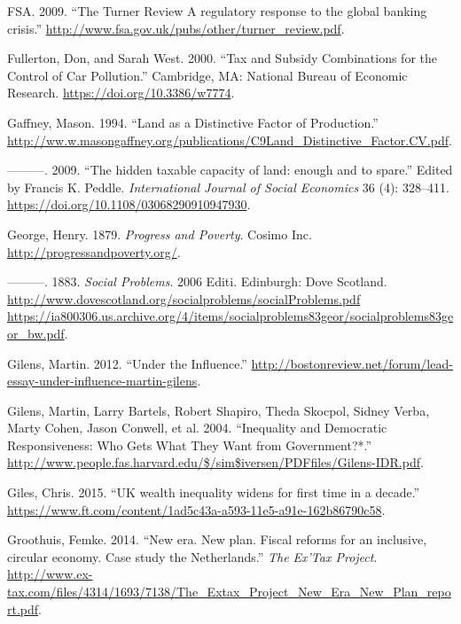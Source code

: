 \documentclass[]{tufte-handout}
\begin{document}
\leavevmode\hypertarget{ref-FSA2009}{}%
FSA. 2009. ``The Turner Review A regulatory response to the global
banking crisis.''
\url{http://www.fsa.gov.uk/pubs/other/turner_review.pdf}.

\leavevmode\hypertarget{ref-Fullerton2000}{}%
Fullerton, Don, and Sarah West. 2000. ``Tax and Subsidy Combinations for
the Control of Car Pollution.'' Cambridge, MA: National Bureau of
Economic Research. \url{https://doi.org/10.3386/w7774}.

\leavevmode\hypertarget{ref-Gaffney1994}{}%
Gaffney, Mason. 1994. ``Land as a Distinctive Factor of Production.''
\url{http://ww.w.masongaffney.org/publications/C9Land_Distinctive_Factor.CV.pdf}.

\leavevmode\hypertarget{ref-Gaffney2009}{}%
---------. 2009. ``The hidden taxable capacity of land: enough and to
spare.'' Edited by Francis K. Peddle. \emph{International Journal of
Social Economics} 36 (4): 328--411.
\url{https://doi.org/10.1108/03068290910947930}.

\leavevmode\hypertarget{ref-George1879}{}%
George, Henry. 1879. \emph{Progress and Poverty}. Cosimo Inc.
\url{http://progressandpoverty.org/}.

\leavevmode\hypertarget{ref-George}{}%
---------. 1883. \emph{Social Problems}. 2006 Editi. Edinburgh: Dove
Scotland.
\href{http://www.dovescotland.org/socialproblems/socialProblems.pdf\%20https://ia800306.us.archive.org/4/items/socialproblems83geor/socialproblems83geor_bw.pdf}{http://www.dovescotland.org/socialproblems/socialProblems.pdf https://ia800306.us.archive.org/4/items/socialproblems83geor/socialproblems83geor\_bw.pdf}.

\leavevmode\hypertarget{ref-Gilens2012}{}%
Gilens, Martin. 2012. ``Under the Influence.''
\url{http://bostonreview.net/forum/lead-essay-under-influence-martin-gilens}.

\leavevmode\hypertarget{ref-Gilens2004}{}%
Gilens, Martin, Larry Bartels, Robert Shapiro, Theda Skocpol, Sidney
Verba, Marty Cohen, Jason Conwell, et al. 2004. ``Inequality and
Democratic Responsiveness: Who Gets What They Want from Government?*.''
\url{http://www.people.fas.harvard.edu/$/sim$iversen/PDFfiles/Gilens-IDR.pdf}.

\leavevmode\hypertarget{ref-Giles2015}{}%
Giles, Chris. 2015. ``UK wealth inequality widens for first time in a
decade.''
\url{https://www.ft.com/content/1ad5c43a-a593-11e5-a91e-162b86790c58}.

\leavevmode\hypertarget{ref-Groothuis2014}{}%
Groothuis, Femke. 2014. ``New era. New plan. Fiscal reforms for an
inclusive, circular economy. Case study the Netherlands.'' \emph{The
Ex'Tax Project}.
\url{http://www.ex-tax.com/files/4314/1693/7138/The_Extax_Project_New_Era_New_Plan_report.pdf}.
\end{document}
